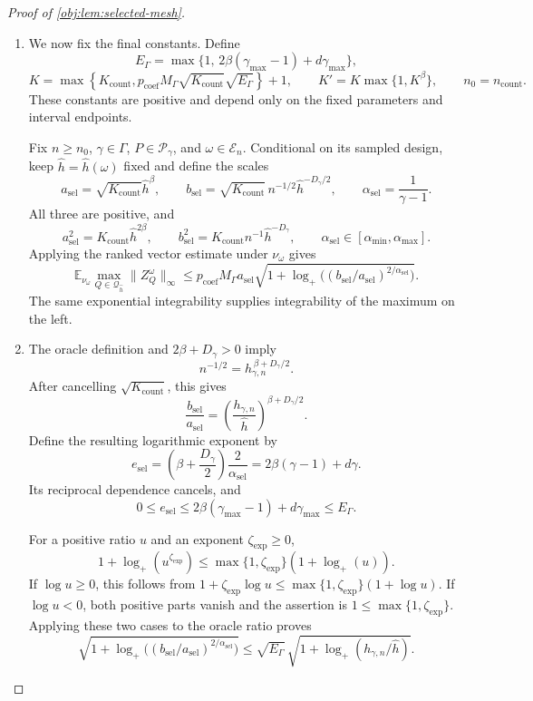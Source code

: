 \begin{proof}[Proof of \cref{obj:lem:selected-mesh}]
\begin{enumerate}
\item We now fix the final constants. Define
\[
E_\Gamma
=
\max\{1,\,2\beta(\gamma_{\max}-1)+d\gamma_{\max}\},
\]
\[
K=
\max\!\left\{
K_{\mathrm{count}},
p_{\mathrm{coef}}M_\Gamma
\sqrt{K_{\mathrm{count}}}\sqrt{E_\Gamma}
\right\}+1,
\qquad
K'=K\max\{1,K^\beta\},
\qquad
n_0=n_{\mathrm{count}}.
\]
These constants are positive and depend only on the fixed parameters
and interval endpoints.

Fix \(n\ge n_0\), \(\gamma\in\Gamma\), \(P\in\mathcal P_\gamma\), and
\(\omega\in\mathcal E_n\). Conditional on its sampled design, keep
\(\widehat h=\widehat h(\omega)\) fixed and define the scales
\[
a_{\mathrm{sel}}
=
\sqrt{K_{\mathrm{count}}}\widehat h^\beta,
\qquad
b_{\mathrm{sel}}
=
\sqrt{K_{\mathrm{count}}}\,
n^{-1/2}\widehat h^{-D_\gamma/2},
\qquad
\alpha_{\mathrm{sel}}=\frac1{\gamma-1}.
\]
All three are positive, and
\[
a_{\mathrm{sel}}^2
=K_{\mathrm{count}}\widehat h^{2\beta},
\qquad
b_{\mathrm{sel}}^2
=K_{\mathrm{count}}n^{-1}\widehat h^{-D_\gamma},
\qquad
\alpha_{\mathrm{sel}}\in[\alpha_{\min},\alpha_{\max}].
\]
Applying the ranked vector estimate under \(\nu_\omega\) gives
\[
\mathbb E_{\nu_\omega}
\max_{Q\in\mathcal Q_{\widehat h}}\|Z_Q^\omega\|_\infty
\le
p_{\mathrm{coef}}M_\Gamma a_{\mathrm{sel}}
\sqrt{
1+\log_+\bigl((b_{\mathrm{sel}}/a_{\mathrm{sel}})
^{2/\alpha_{\mathrm{sel}}}\bigr)
}.
\]
The same exponential integrability supplies integrability of the
maximum on the left.

\item The oracle definition and \(2\beta+D_\gamma>0\) imply
\[
n^{-1/2}
=h_{\gamma,n}^{\,\beta+D_\gamma/2}.
\]
After cancelling \(\sqrt{K_{\mathrm{count}}}\), this gives
\[
\frac{b_{\mathrm{sel}}}{a_{\mathrm{sel}}}
=
\left(\frac{h_{\gamma,n}}{\widehat h}\right)^{
\beta+D_\gamma/2}.
\]
Define the resulting logarithmic exponent by
\[
e_{\mathrm{sel}}
=
\left(\beta+\frac{D_\gamma}{2}\right)
\frac2{\alpha_{\mathrm{sel}}}
=
2\beta(\gamma-1)+d\gamma.
\]
Its reciprocal dependence cancels, and
\[
0\le e_{\mathrm{sel}}
\le2\beta(\gamma_{\max}-1)+d\gamma_{\max}
\le E_\Gamma.
\]

For a positive ratio \(u\) and an exponent \(\zeta_{\mathrm{exp}}\ge0\),
\[
1+\log_+(u^{\zeta_{\mathrm{exp}}})
\le\max\{1,\zeta_{\mathrm{exp}}\}(1+\log_+(u)).
\]
If \(\log u\ge0\), this follows from
\(1+\zeta_{\mathrm{exp}}\log u\le\max\{1,\zeta_{\mathrm{exp}}\}(1+\log u)\).
If \(\log u<0\), both positive parts vanish and the assertion is
\(1\le\max\{1,\zeta_{\mathrm{exp}}\}\). Applying these two cases to the oracle ratio proves
\[
\sqrt{
1+\log_+\bigl((b_{\mathrm{sel}}/a_{\mathrm{sel}})
^{2/\alpha_{\mathrm{sel}}}\bigr)
}
\le
\sqrt{E_\Gamma}\,
\sqrt{1+\log_+(h_{\gamma,n}/\widehat h)}.
\]


\end{enumerate}
\end{proof}
